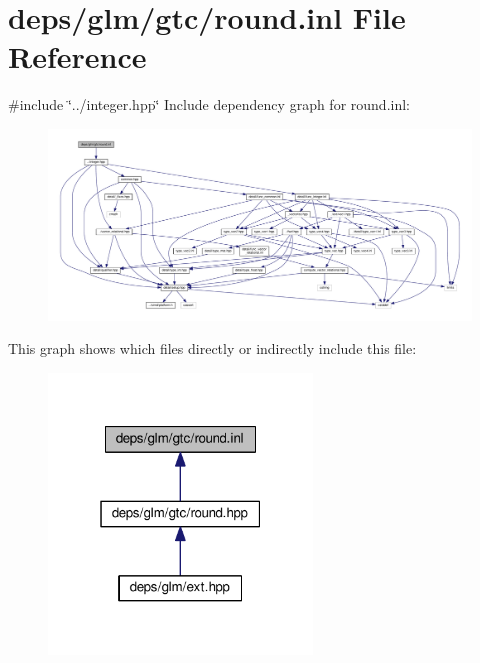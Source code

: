 \hypertarget{round_8inl}{}\section{deps/glm/gtc/round.inl File Reference}
\label{round_8inl}
{\ttfamily \#include \char`\"{}../integer.\+hpp\char`\"{}}\newline
Include dependency graph for round.\+inl\+:
\nopagebreak
\begin{figure}[H]
\begin{center}
\leavevmode
\includegraphics[width=350pt]{dc/dde/round_8inl__incl}
\end{center}
\end{figure}
This graph shows which files directly or indirectly include this file\+:
\nopagebreak
\begin{figure}[H]
\begin{center}
\leavevmode
\includegraphics[width=199pt]{de/d31/round_8inl__dep__incl}
\end{center}
\end{figure}
